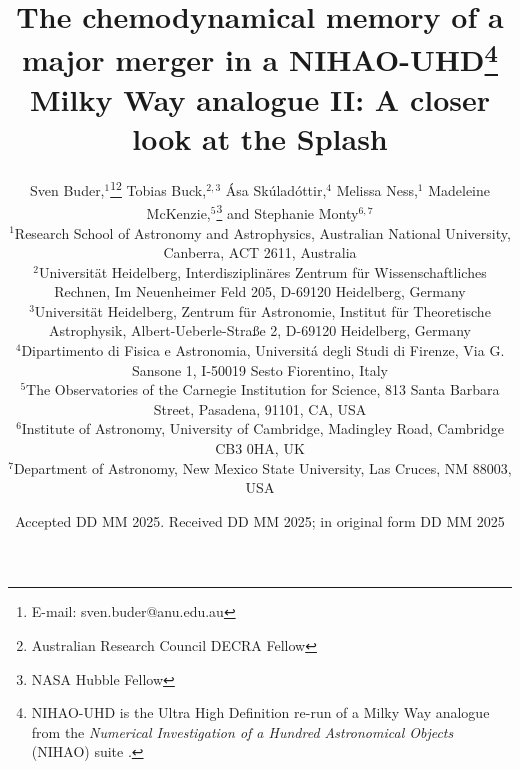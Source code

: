 \documentclass[fleqn,usenatbib]{mnras}
\title[A closer look at the Splash]{The chemodynamical memory of a major merger in a NIHAO-UHD\thanks{NIHAO-UHD is the Ultra High Definition re-run of a Milky Way analogue from the \textit{Numerical Investigation of a Hundred Astronomical Objects} (NIHAO) suite \citep{Wang2015}.} Milky Way analogue II: A closer look at the Splash}
\author[S. Buder et al.]{Sven Buder,$^{1}$\thanks{E-mail: sven.buder@anu.edu.au}\thanks{Australian Research Council DECRA Fellow}\orcidlink{0000-0002-4031-8553}
Tobias Buck,$^{2,3}$\orcidlink{0000-0003-2027-399X}
Ása Skúladóttir,$^{4}$\orcidlink{0000-0001-9155-9018}
Melissa Ness,$^{1}$\orcidlink{0000-0001-5082-6693}
Madeleine McKenzie,$^{5}$\thanks{NASA Hubble Fellow}\orcidlink{0000-0002-1715-1257}
and\newauthor
Stephanie Monty$^{6, 7}$\orcidlink{0000-0002-9225-5822}
\\
$^{1}$Research School of Astronomy and Astrophysics, Australian National University, Canberra, ACT 2611, Australia\\
$^{2}$Universit{\"a}t Heidelberg, Interdisziplin{\"a}res Zentrum f{\"u}r Wissenschaftliches Rechnen, Im Neuenheimer Feld 205, D-69120 Heidelberg, Germany\\
$^{3}$Universit{\"a}t Heidelberg, Zentrum f{\"u}r Astronomie, Institut f{\"u}r Theoretische Astrophysik, Albert-Ueberle-Straße 2, D-69120 Heidelberg, Germany\\
$^{4}$Dipartimento di Fisica e Astronomia, Universitá degli Studi di Firenze, Via G. Sansone 1, I-50019 Sesto Fiorentino, Italy\\
$^{5}$The Observatories of the Carnegie Institution for Science, 813 Santa Barbara Street, Pasadena, 91101, CA, USA\\
$^{6}$Institute of Astronomy, University of Cambridge, Madingley Road, Cambridge CB3 0HA, UK\\
$^{7}$Department of Astronomy, New Mexico State University, Las Cruces, NM 88003, USA
}
\date{Accepted DD MM 2025. Received DD MM 2025; in original form DD MM 2025}
\begin{document}
\label{firstpage}
\pagerange{\pageref{firstpage}--\pageref{lastpage}}
\maketitle

\begin{abstract} %

\end{abstract}
\end{document}

